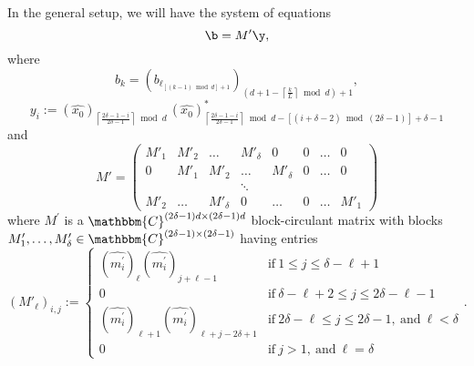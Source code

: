 In the general setup, we will have the system of equations
%
\begin{equation}
  \b = M^\prime \y, 
  \label{eq:block-system}
\end{equation}
where
%
\begin{equation}
  b_k =  \left( b_{\ell_{[(k-1) \! \bmod d]+1}}\right)
        _{\left(d+1-\left\lceil \frac k L\right \rceil 
                \!\bmod d\right)+1},
  \label{eq:interleaved_meas}
\end{equation}
%
\begin{equation}
    y_i := 
        \left(\widehat{x_0} \right)_{\left \lceil \frac{2\delta-1-i}{2\delta-1} 
                \right \rceil \! \bmod d} \,
        \left(\widehat{x_0} \right)^*_{\left \lceil \frac{2\delta-1-i}{2\delta-1} 
                \right \rceil \! \bmod d - 
                \left[(i+\delta-2) \! \bmod (2\delta-1)\right] 
                + \delta - 1}
  \label{eq:phaseDiffs}
\end{equation}
%
and 
%
\begin{equation}
    M' = \left( 
        \begin{array}{llllllll}  
          M'_1& M'_2 & \hdots & M'_{\delta} & 0 & 0 & \hdots & 0\\
          0 & M'_1& M'_2 & \hdots & M'_{\delta} & 0 & \hdots & 0\\ 
             & &  & \ddots &  &  &  & \\
          M'_2  & \hdots & M'_{\delta} & 0 & \hdots & 0 & 
                            \hdots & M'_1  
        \end{array} \right)
    \label{eq:block-circ_mat_general}
\end{equation}
%
where $M^\prime$ is a $\mathbbm{C}^{(2\delta-1)d \times
(2\delta-1)d}$ block-circulant matrix with blocks $M'_1, \dots,
M'_{\delta} \in \mathbbm{C}^{(2\delta-1) \times (2\delta-1)}$
having entries
%
\begin{equation}
    (M'_\ell)_{i,j} := \left\{ 
      \begin{array}{ll} 
        \left(\widehat{m_i^\prime}\right)_\ell 
            \left(\widehat{m_i^\prime}\right)_{j+\ell-1} & 
           \textrm{if}~ 1 \leq j \leq \delta-\ell+1 \\ 
        0                                       & 
           \textrm{if}~ \delta-\ell+2 \leq j \leq 2\delta-\ell-1 \\
        \left(\widehat{m_i^\prime}\right)_{\ell+1} 
            \left(\widehat{m_i^\prime}\right)_{\ell+j-2\delta+1} & 
           \textrm{if}~ 2\delta-\ell \leq j \leq 2\delta-1, 
                ~\textrm{and}~\ell < \delta \\ 
        0 & \textrm{if}~ j > 1, ~\textrm{and}~ \ell = \delta  
      \end{array} \right..
    \label{eq:M'DEF}
\end{equation}
